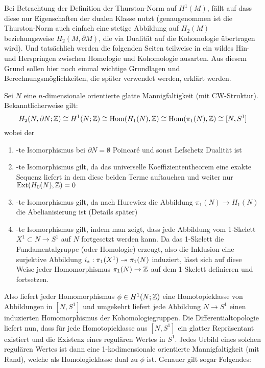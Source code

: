 	Bei Betrachtung der Definition der Thurston-Norm auf $H^1(M)$, fällt auf dass diese nur Eigenschaften der dualen Klasse nutzt (genaugenommen ist die Thurston-Norm auch einfach eine stetige Abbildung auf $H_2(M)$ beziehungsweise $H_2(M,\partial M)$, die via Dualität auf die Kohomologie übertragen wird). Und tatsächlich werden die folgenden Seiten teilweise in ein wildes Hin- und Herspringen zwischen Homologie und Kohomologie ausarten. Aus diesem Grund sollen hier noch einmal wichtige Grundlagen und Berechnungsmöglichkeiten, die später verwendet werden, erklärt werden.
	\begin{bem}
	Sei $N$ eine $n$-dimensionale orientierte glatte Mannigfaltigkeit (mit CW-Struktur).
		Bekanntlicherweise gilt:
		\[
					H_2(N,\partial N;\mathbb{Z})\cong H^1(N;\mathbb{Z}) \cong \operatorname{Hom}(H_1(N),\mathbb{Z}) \cong \operatorname{Hom}(\pi_1(N),\mathbb{Z}) \cong  [N,S^1]
		\]		
		wobei der
		\begin{enumerate}
			\item -te Isomorphismus bei $\partial N= \emptyset$ Poincaré und sonst Lefschetz Dualität ist
			\item -te Isomorphismus gilt, da das universelle Koeffiziententheorem eine exakte Sequenz liefert in dem diese beiden Terme auftauchen und weiter nur $\operatorname{Ext}(H_0(N),\mathbb{Z}) = 0$
			\item -te Isomorphismus gilt, da nach Hurewicz die Abbildung $\pi_1(N)\to H_1(N)$ die Abelianisierung ist (Details später)
			\item -te Isomorphismus gilt, indem man zeigt, dass jede Abbildung vom 1-Skelett $X^1 \subset N \to S^1$ auf $N$ fortgesetzt werden kann. Da das 1-Skelett die Fundamentalgruppe (oder Homologie) erzeugt, also die Inklusion eine surjektive Abbildung $i_*:\pi_1(X^1)\twoheadrightarrow\pi_1(N)$ induziert, lässt sich auf diese Weise jeder Homomorphismus $\pi_1(N)\to \mathbb{Z}$ auf dem 1-Skelett definieren und fortsetzen. 
		\end{enumerate}
	Also liefert jeder Homomorphismus $\phi \in H^1(N;\mathbb{Z})$ eine Homotopieklasse von Abbildungen in $[N,S^1]$ und umgekehrt liefert jede Abbildung $N\to S^1$ einen induzierten Homomorphismus der Kohomologiegruppen. Die Differentialtopologie liefert nun, dass für jede Homotopieklasse aus $[N,S^1]$ ein glatter Repräsentant existiert und die Existenz eines regulären Wertes in $S^1$. Jedes Urbild eines solchen regulären Wertes ist dann eine 1-kodimensionale orientierte Mannigfaltigkeit (mit Rand), welche als Homologieklasse dual zu $\phi$ ist. Genauer gilt sogar Folgendes:
	\begin{thm}

\end{thm}
\end{bem}

